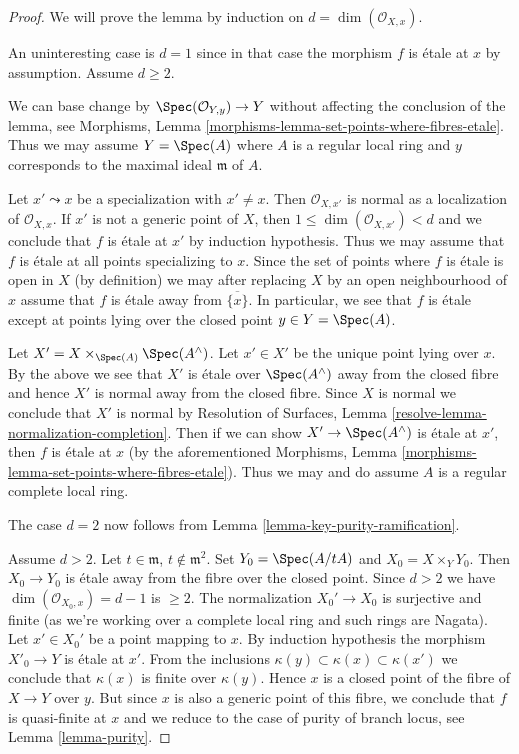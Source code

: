 \begin{proof}
We will prove the lemma by induction on $d = \dim(\mathcal{O}_{X, x})$.

\medskip\noindent
An uninteresting case is $d = 1$ since in that case the morphism
$f$ is \'etale at $x$ by assumption. Assume $d \geq 2$.

\medskip\noindent
We can base change by $\Spec(\mathcal{O}_{Y, y}) \to Y$
without affecting the conclusion of the lemma, see
Morphisms, Lemma \ref{morphisms-lemma-set-points-where-fibres-etale}.
Thus we may assume $Y = \Spec(A)$ where $A$ is a regular local
ring and $y$ corresponds to the maximal ideal $\mathfrak m$ of $A$.

\medskip\noindent
Let $x' \leadsto x$ be a specialization with $x' \not = x$.
Then $\mathcal{O}_{X, x'}$ is normal as a localization of
$\mathcal{O}_{X, x}$. If $x'$ is not a generic point of $X$,
then $1 \leq \dim(\mathcal{O}_{X, x'}) < d$ and we conclude that
$f$ is \'etale at $x'$ by induction hypothesis.
Thus we may assume that $f$ is \'etale at all points specializing to
$x$. Since the set of points where $f$ is \'etale is open in $X$
(by definition) we may after replacing $X$ by an open neighbourhood of $x$
assume that $f$ is \'etale away from $\overline{\{x\}}$.
In particular, we see that $f$ is \'etale except at points
lying over the closed point $y \in Y = \Spec(A)$.

\medskip\noindent
Let $X' = X \times_{\Spec(A)} \Spec(A^\wedge)$. Let $x' \in X'$
be the unique point lying over $x$. By the above we see that
$X'$ is \'etale over $\Spec(A^\wedge)$ away from the closed fibre and
hence $X'$ is normal away from the closed fibre. Since $X$ is normal
we conclude that $X'$ is normal by
Resolution of Surfaces, Lemma \ref{resolve-lemma-normalization-completion}.
Then if we can show $X' \to \Spec(A^\wedge)$ is \'etale at $x'$,
then $f$ is \'etale at $x$ (by the aforementioned
Morphisms, Lemma \ref{morphisms-lemma-set-points-where-fibres-etale}).
Thus we may and do assume $A$ is a regular complete local ring.

\medskip\noindent
The case $d = 2$ now follows from Lemma \ref{lemma-key-purity-ramification}.

\medskip\noindent
Assume $d > 2$. Let $t \in \mathfrak m$, $t \not \in \mathfrak m^2$.
Set $Y_0 = \Spec(A/tA)$ and $X_0 = X \times_Y Y_0$.
Then $X_0 \to Y_0$ is \'etale away from the fibre over the closed point.
Since $d > 2$ we have $\dim(\mathcal{O}_{X_0, x}) = d - 1$ is $\geq 2$.
The normalization $X_0' \to X_0$ is surjective and finite
(as we're working over a complete local ring and such rings are Nagata).
Let $x' \in X_0'$ be a point mapping to $x$. By induction hypothesis the
morphism $X'_0 \to Y$ is \'etale at $x'$. From the inclusions
$\kappa(y) \subset \kappa(x) \subset \kappa(x')$
we conclude that $\kappa(x)$ is finite over $\kappa(y)$.
Hence $x$ is a closed point of the fibre of $X \to Y$
over $y$. But since $x$ is also a generic point of
this fibre, we conclude that $f$ is quasi-finite at $x$
and we reduce to the case of purity of branch locus, see
Lemma \ref{lemma-purity}.
\end{proof}




